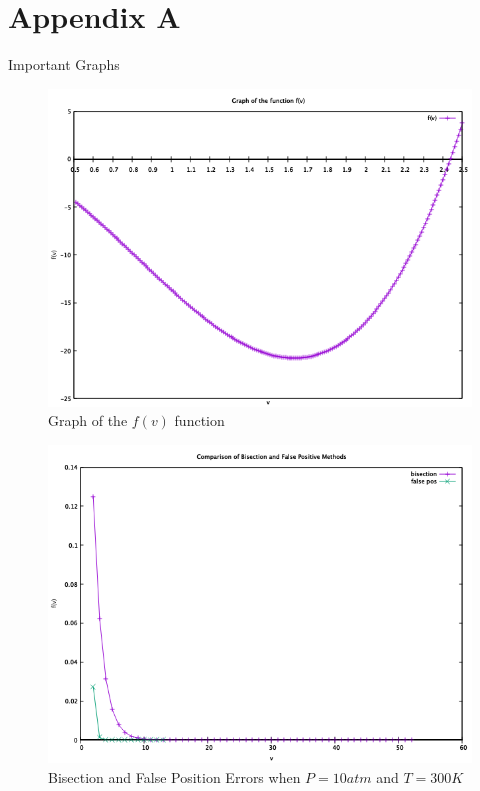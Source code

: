 \documentclass[12pt, letterpaper]{article}
\begin{document}
	\section{Appendix A}
		Important Graphs
		\begin{figure}[htp]
			\centering
			\includegraphics[width=\linewidth]{f(v)-plot.png}
			\caption{Graph of the $f(v)$ function}
			\label{a}
		\end{figure}
		\begin{figure}[htp]
			\centering
			\includegraphics[width=\linewidth]{bisecVSfalse.png}
			\caption{Bisection and False Position Errors when $P=10atm$ and $T=300K$}
			\label{b}
		\end{figure}
\end{document}
